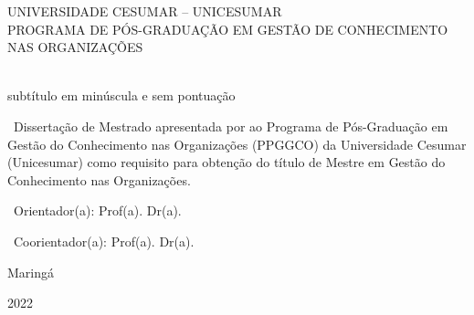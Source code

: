
\begin{center}
	{\ABNTEXchapterfont\Large UNIVERSIDADE CESUMAR – UNICESUMAR}\\
	{\ABNTEXchapterfont\Large PROGRAMA DE PÓS-GRADUAÇÃO EM GESTÃO DE CONHECIMENTO NAS ORGANIZAÇÕES}
	\vspace*{85mm}
    	
	{\ABNTEXchapterfont\Huge\imprimirtitulo}\\[5mm]
	{\ABNTEXchapterfont\huge subtítulo em minúscula e sem pontuação}
	\vskip 20mm
\end{center}        

\begin{minipage}[c]{.8\textwidth}
	\hspace{45mm}                                 
	\begin{minipage}[h]{.8\textwidth}
		{\ABNTEXchapterfont\ 
   			Dissertação de Mestrado apresentada por \imprimirautor ao  Programa de Pós-Graduação em Gestão do Conhecimento nas   Organizações (PPGGCO) da Universidade Cesumar (Unicesumar) como requisito  para obtenção do título de Mestre em Gestão do Conhecimento nas Organizações.}
	\end{minipage} 
\end{minipage} 
	\vskip 8mm	
	
\begin{flushright}
   	{\ABNTEXchapterfont\ Orientador(a): Prof(a). Dr(a). \imprimirorientador}
\end{flushright} 
    
\begin{flushright}	
	{\ABNTEXchapterfont\ Coorientador(a): Prof(a). Dr(a). \imprimircoorientador}
\end{flushright}	
\vskip 20mm
     
\begin{center}    
   	{\ABNTEXchapterfont\Large Maringá}
    \par
    {\ABNTEXchapterfont\Large 2022}
\end{center}
